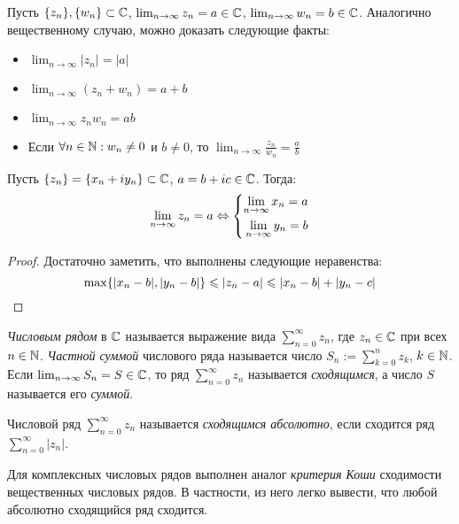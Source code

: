 \begin{note}
	Пусть $\{z_n\}, \{w_n\} \subset \Cm$, $\lim_{n \to \infty}z_n = a \in \Cm$, $\lim_{n \to \infty}w_n = b \in \Cm$. Аналогично вещественному случаю, можно доказать следующие факты:
	\begin{itemize}
		\item $\lim_{n \to \infty}|z_n| = |a|$
		\item $\lim_{n \to \infty}(z_n+w_n) = a+b$
		\item $\lim_{n \to \infty}z_nw_n = ab$
		\item Если $\forall n \in \N: w_n \ne 0$ и $b \ne 0$, то $\lim_{n \to \infty}\frac{z_n}{w_n} = \frac ab$
	\end{itemize}
\end{note}

\begin{proposition}
	Пусть $\{z_n\} = \{x_n + iy_n\} \subset \Cm$, $a = b+ic \in \Cm$. Тогда:
	\[\lim_{n \to \infty}z_n = a \lra \System{
		\lim_{n \to \infty}x_n = a\\
		\lim_{n \to \infty}y_n = b
	}\]
\end{proposition}

\begin{proof}
	Достаточно заметить, что выполнены следующие неравенства:
	\[\max\{|x_n - b|, |y_n - b|\} \le |z_n - a| \le |x_n - b| + |y_n - c|\qedhere\]
\end{proof}

\begin{definition}
	\textit{Числовым рядом} в $\Cm$ называется выражение вида $\sum_{n = 0}^\infty z_n$, где $z_n \in \Cm$ при всех $n \in \N$. \textit{Частной суммой} числового ряда называется число $S_n := \sum_{k = 0}^nz_k$, $k \in \N$. Если $\lim_{n \to \infty}S_n = S \in \Cm$, то ряд $\sum_{n = 0}^\infty z_n$ называется \textit{сходящимся}, а число $S$ называется его \textit{суммой}.
\end{definition}

\begin{definition}
	Числовой ряд $\sum_{n = 0}^\infty z_n$ называется \textit{сходящимся абсолютно}, если сходится ряд $\sum_{n = 0}^\infty|z_n|$.
\end{definition}

\begin{note}
	Для комплексных числовых рядов выполнен аналог \textit{критерия Коши} сходимости вещественных числовых рядов. В частности, из него легко вывести, что любой абсолютно сходящийся ряд сходится.
\end{note}

